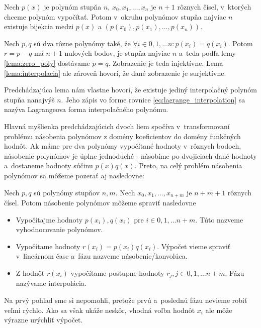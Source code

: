 \begin{lema}
Nech $p(x)$ je polynóm stupňa $n$, $x_0,x_1,\dots,x_n$ je $n+1$
rôznych čísel, v~ktorých chceme polynóm vypočítať.
Potom v~okruhu polynómov stupňa najviac $n$ existuje bijekcia medzi $p(x)$
a $(p(x_0),p(x_1),\dots,p(x_{n}))$.
\end{lema}
\begin{dokaz}
Nech $p,q$ sú dva rôzne polynómy také, že $\forall i\in 0,1,\dots n:
p(x_i) = q(x_i)$. Potom $r=p-q$ má $n+1$ nulových bodov, je stupňa
najviac $n$ a~teda podľa lemy \ref{lema:zero_poly} dostávame $p=q$.
Zobrazenie je teda injektívne. Lema \ref{lema:interpolacia} ale
zároveň hovorí, že dané zobrazenie je surjektívne.
\end{dokaz}

\begin{poznamka}
  Predchádzajúca lema nám vlastne hovorí, že existuje jediný
  interpolačný polynóm stupňa nanajvýš $n$. Jeho zápis vo forme
  rovnice \eqref{eq:lagrange_interpolation} sa nazýva Lagrangeova
  forma interpolačného polynómu.
\end{poznamka}
Hlavná myšlienka predchádzajúcich dvoch liem spočíva v~transformovaní
problému násobenia polynómov z domény koeficientov do domény funkčných
hodnôt. Ak máme pre dva polynómy vypočítané hodnoty v~rôznych bodoch, násobenie
polynómov je úplne jednoduché - násobíme po dvojiciach dané hodnoty 
a~dostaneme hodnoty súčinu $p(x)q(x)$. Preto, na celý problém násobenia
polynómov sa môžeme pozerať aj nasledovne:

Nech $p,q$ sú polynómy stupňov $n,m$. Nech $x_0,x_1,\dots, x_{n+m}$ je
$n+m+1$ rôznych čísel. Potom násobenie polynómov môžeme spraviť
nasledovne
\begin{itemize}
  \item Vypočítajme hodnoty $p(x_i), q(x_i)$ pre $i\in0,1,\dots n+m$.
  Túto nazveme vyhodnocovanie polynómov.
  \item Vypočítame hodnoty $r(x_i) = p(x_i) q(x_i)$. Výpočet vieme
  spraviť v~lineárnom čase a~fázu nazveme násobenie/konvolúca.
  \item Z hodnôt $r(x_i)$ vypočítame postupne hodnoty $r_j, j\in
  0,1,\dots n+m$. Fázu nazývame interpolácia.
\end{itemize}

Na prvý pohľad sme si nepomohli, pretože prvú a~poslednú fázu nevieme
robiť veľmi rýchlo. Ako sa však ukáže neskôr, vhodná voľba hodnôt
$x_i$ ale môže výrazne urýchliť výpočet.

